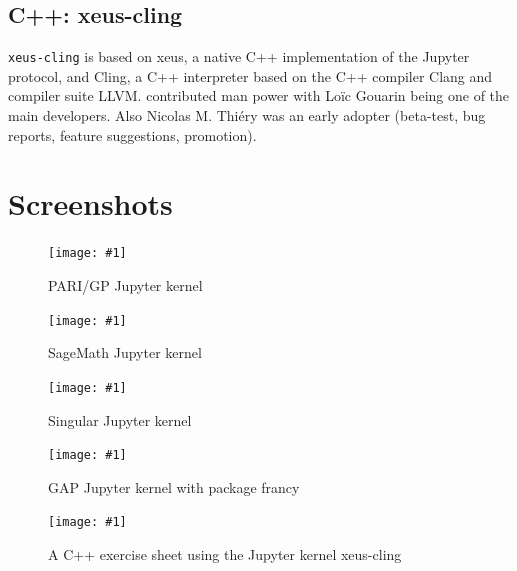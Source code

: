 \documentclass{deliverablereport}
\begin{document}
\subsection{C++: xeus-cling}

\texttt{xeus-cling} is based on xeus, a native C++ implementation of
the Jupyter protocol, and Cling, a C++ interpreter based on the C++
compiler Clang and compiler suite LLVM. \ODK contributed man power
with Loïc Gouarin being one of the main developers. Also Nicolas M.
Thiéry was an early adopter (beta-test, bug reports, feature
suggestions, promotion).


\appendix
\section{Screenshots}
\newcommand{\screenshot}[2]{
\begin{figure}[ht]
  \texttt{[image: \#1]}
  \caption{#2}
\end{figure}}

\screenshot{pari.png}{PARI/GP Jupyter kernel}
\screenshot{sage.png}{SageMath Jupyter kernel}
\screenshot{singular_new.png}{Singular Jupyter kernel}
\clearpage
\screenshot{gap.png}{GAP Jupyter kernel with package francy}
\clearpage
\screenshot{cling-teaching.png}{A C++ exercise sheet using the Jupyter kernel xeus-cling}
\end{document}
